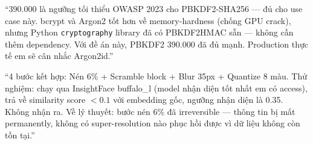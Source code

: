 \documentclass[12pt, a4paper]{article}
\begin{document}
\begin{tcolorbox}[colback=gray!5, colframe=BrickRed, breakable,
  title={\textbf{Q: 390.000 có đủ? Sao không dùng bcrypt hay Argon2?}}]
``390.000 là ngưỡng tối thiểu OWASP 2023 cho PBKDF2-SHA256 --- đủ cho use case này.
bcrypt và Argon2 tốt hơn về memory-hardness (chống GPU crack),
nhưng Python \texttt{cryptography} library đã có PBKDF2HMAC sẵn --- không cần thêm dependency.
Với đề án này, PBKDF2 390.000 đã đủ mạnh.
Production thực tế em sẽ cân nhắc Argon2id.''
\end{tcolorbox}

\begin{tcolorbox}[colback=gray!5, colframe=BrickRed, breakable,
  title={\textbf{Q: \_obliterate có thực sự không thể phục hồi không?}}]
``4 bước kết hợp: Nén 6\% + Scramble block + Blur 35px + Quantize 8 màu.
Thử nghiệm: chạy qua InsightFace buffalo\_l (model nhận diện tốt nhất em có access),
trả về similarity score $< 0.1$ với embedding gốc, ngưỡng nhận diện là 0.35.
Không nhận ra.
Về lý thuyết: bước nén 6\% đã irreversible --- thông tin bị mất permanently, không có super-resolution nào phục hồi được vì dữ liệu không còn tồn tại.''
\end{tcolorbox}
\end{document}
